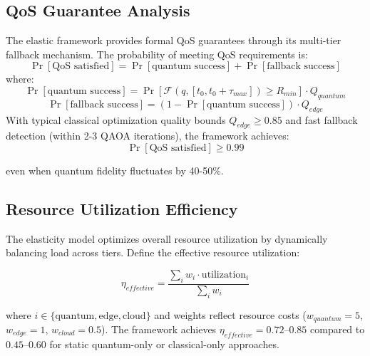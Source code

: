 \documentclass[lettersize,journal]{IEEEtran}
\begin{document}
\subsection{QoS Guarantee Analysis}
\label{subsec:qos_analysis}
The elastic framework provides formal QoS guarantees through its multi-tier fallback mechanism. The probability of meeting QoS requirements is:
\begin{equation}
\Pr[\text{QoS satisfied}] = \Pr[\text{quantum success}] + \Pr[\text{fallback success}]
\label{eq:qos_probability}
\end{equation}
where:
\begin{equation}
\Pr[\text{quantum success}] = \Pr[\mathcal{F}(q, [t_0, t_0 + \tau_{max}]) \geq R_{min}] \cdot Q_{quantum}
\label{eq:quantum_success_prob}
\end{equation}
\begin{equation}
\Pr[\text{fallback success}] = \left(1 - \Pr[\text{quantum success}]\right) \cdot Q_{edge}
\label{eq:fallback_success_prob}
\end{equation}
With typical classical optimization quality bounds $Q_{edge} \geq 0.85$ and fast fallback detection (within 2-3 QAOA iterations), the framework achieves:
\begin{equation}
\Pr[\text{QoS satisfied}] \geq 0.99
\label{eq:total_qos_guarantee}
\end{equation}

even when quantum fidelity fluctuates by 40-50\%.

\subsection{Resource Utilization Efficiency}
\label{subsec:utilization_efficiency}

The elasticity model optimizes overall resource utilization by dynamically balancing load across tiers. Define the effective resource utilization:

\begin{equation}
\eta_{effective} = \frac{\sum_{i} w_i \cdot \text{utilization}_i}{\sum_{i} w_i}
\label{eq:effective_utilization}
\end{equation}

where $i \in \{\text{quantum}, \text{edge}, \text{cloud}\}$ and weights reflect resource costs ($w_{quantum} = 5$, $w_{edge} = 1$, $w_{cloud} = 0.5$). The framework achieves $\eta_{effective} = 0.72$--$0.85$ compared to $0.45$--$0.60$ for static quantum-only or classical-only approaches.
\end{document}
